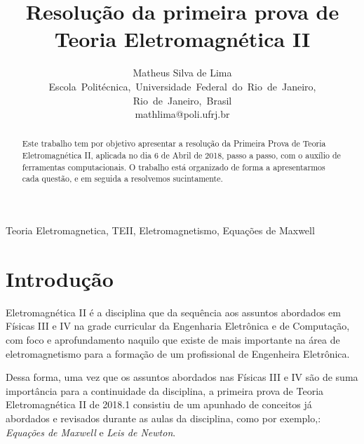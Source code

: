 \documentclass[journal,comsoc]{IEEEtran}
\begin{document}
\title{Resolução da primeira prova de Teoria Eletromagnética II}
%
\author{ Matheus Silva de Lima \\ Escola~Politécnica,~Universidade~Federal~do~Rio~de~Janeiro,
Rio~de~Janeiro,~Brasil\\mathlima@poli.ufrj.br}
{}
\maketitle

\begin{abstract}
	Este trabalho tem por objetivo apresentar a resolução da Primeira Prova de Teoria Eletromagnética II, aplicada no dia 6 de Abril de 2018, passo a passo, com o auxílio de ferramentas computacionais. O trabalho está organizado de forma a apresentarmos cada questão, e em seguida a resolvemos sucintamente.
\end{abstract}

\renewcommand\IEEEkeywordsname{Palavras-chave}
\begin{IEEEkeywords}
Teoria Eletromagnetica, TEII, Eletromagnetismo, Equações de Maxwell 
\end{IEEEkeywords}

\section{Introdução}
 Eletromagnética II é a disciplina que da sequência aos assuntos abordados em Físicas III e IV na grade curricular da Engenharia Eletrônica e de Computação, com foco e aprofundamento naquilo que existe de mais importante na área de eletromagnetismo para a formação de um profissional de Engenheira Eletrônica.
\par Dessa forma, uma vez que os assuntos abordados nas Físicas III e IV são de suma importância para a continuidade da disciplina, a primeira prova de Teoria Eletromagnética II de 2018.1 consistiu de um apunhado de conceitos já abordados e revisados durante as aulas da disciplina, como por exemplo,: \textit{Equações de Maxwell} e \textit{Leis de Newton}. 
\end{document}

